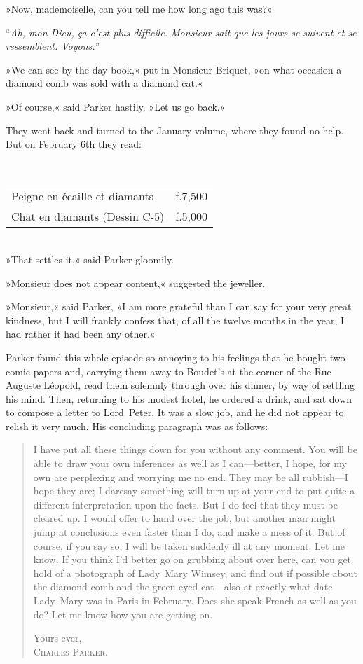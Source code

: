»Now, mademoiselle, can you tell me how long ago this was?«

\foreignquote{french}{\textit{Ah, mon Dieu, ça c'est plus difficile. Monsieur sait que les jours se suivent et se ressemblent. Voyons.}}

»We can see by the day-book,« put in Monsieur Briquet, »on what occasion a diamond comb was sold with a diamond cat.«

»Of course,« said Parker hastily. »Let us go back.«

They went back and turned to the January volume, where they found no help. But on February 6th they read:

~\\
\begin{tabular} { l l } 
\foreignlanguage{french}{Peigne en écaille et diamants}&f.7,500\\
\foreignlanguage{french}{Chat en diamants (Dessin C-5)}&f.5,000\\
\end{tabular}
~\\

»That settles it,« said Parker gloomily.

»Monsieur does not appear content,« suggested the jeweller.

»Monsieur,« said Parker, »I am more grateful than I can say for your very great kindness, but I will frankly confess that, of all the twelve months in the year, I had rather it had been any other.«

Parker found this whole episode so annoying to his feelings that he bought two comic papers and, carrying them away to Boudet's at the corner of the Rue Auguste Léopold, read them solemnly through over his dinner, by way of settling his mind. Then, returning to his modest hotel, he ordered a drink, and sat down to compose a letter to Lord~Peter. It was a slow job, and he did not appear to relish it very much.  His concluding paragraph was as follows:

\begin{quote}

I have put all these things down for you without any comment. You will be able to draw your own inferences as well as I can—better, I hope, for my own are perplexing and worrying me no end. They may be all rubbish—I hope they are; I daresay something will turn up at your end to put quite a different interpretation upon the facts. But I do feel that they must be cleared up. I would offer to hand over the job, but another man might jump at conclusions even faster than I do, and make a mess of it. But of course, if you say so, I will be taken suddenly ill at any moment. Let me know. If you think I'd better go on grubbing about over here, can you get hold of a photograph of Lady~Mary Wimsey, and find out if possible about the diamond comb and the green-eyed cat—also at exactly what date Lady~Mary was in Paris in February. Does she speak French as well as you do? Let me know how you are getting on.

\begin{flushright}
Yours ever,\\
\textsc{Charles Parker.}
\end{flushright}
\end{quote}


